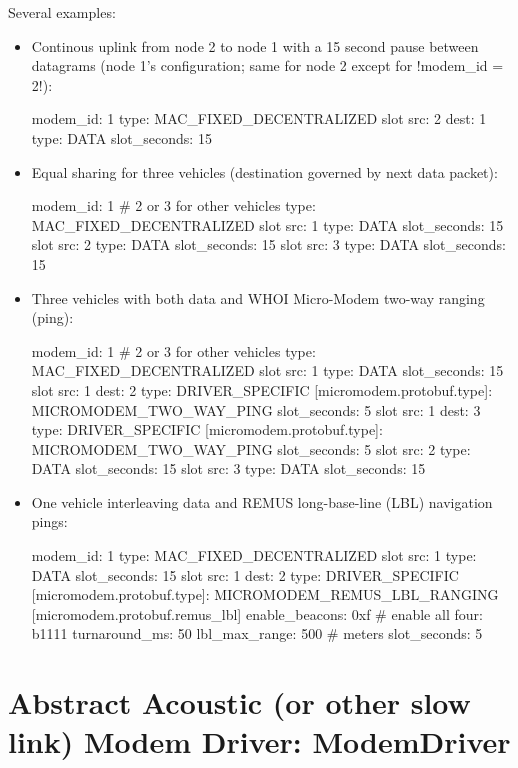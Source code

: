 Several examples:
\begin{itemize}
\item Continous uplink from node 2 to node 1 with a 15 second pause between datagrams (node 1's configuration; same for node 2 except for !modem_id = 2!):
\begin{boxedverbatim}
modem_id: 1
type: MAC_FIXED_DECENTRALIZED
slot { src: 2  dest: 1  type: DATA  slot_seconds: 15 }
\end{boxedverbatim}
\resetbvlinenumber
\item Equal sharing for three vehicles (destination governed by next data packet):
\begin{boxedverbatim}
modem_id: 1 # 2 or 3 for other vehicles
type: MAC_FIXED_DECENTRALIZED
slot { src: 1  type: DATA  slot_seconds: 15 }
slot { src: 2  type: DATA  slot_seconds: 15 }
slot { src: 3  type: DATA  slot_seconds: 15 }
\end{boxedverbatim}
\resetbvlinenumber
\item Three vehicles with both data and WHOI Micro-Modem two-way ranging (ping):
\begin{boxedverbatim}
modem_id: 1 # 2 or 3 for other vehicles
type: MAC_FIXED_DECENTRALIZED
slot { src: 1  type: DATA  slot_seconds: 15 }
slot { 
  src: 1
  dest: 2
  type: DRIVER_SPECIFIC 
  [micromodem.protobuf.type]: MICROMODEM_TWO_WAY_PING
  slot_seconds: 5
}
slot { 
  src: 1
  dest: 3
  type: DRIVER_SPECIFIC 
  [micromodem.protobuf.type]: MICROMODEM_TWO_WAY_PING
  slot_seconds: 5
}
slot { src: 2  type: DATA  slot_seconds: 15 }
slot { src: 3  type: DATA  slot_seconds: 15 }
\end{boxedverbatim}
\resetbvlinenumber
\item One vehicle interleaving data and REMUS long-base-line (LBL) navigation pings:
\begin{boxedverbatim}
modem_id: 1
type: MAC_FIXED_DECENTRALIZED
slot { src: 1  type: DATA  slot_seconds: 15 }
slot { 
  src: 1
  dest: 2
  type: DRIVER_SPECIFIC 
  [micromodem.protobuf.type]: MICROMODEM_REMUS_LBL_RANGING
  [micromodem.protobuf.remus_lbl] {
    enable_beacons: 0xf   # enable all four: b1111
    turnaround_ms: 50
    lbl_max_range: 500 # meters
  }
  slot_seconds: 5
}
\end{boxedverbatim}
\resetbvlinenumber
\end{itemize}

\section{Abstract Acoustic (or other slow link) Modem Driver: ModemDriver} \label{sec:driver}

